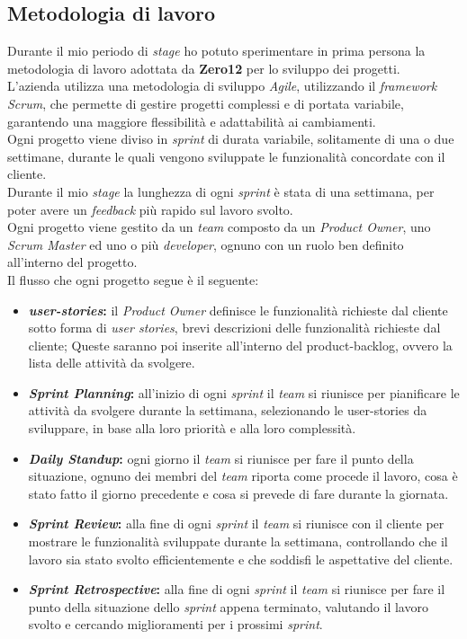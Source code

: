 \subsection{Metodologia di lavoro}
\label{sez:metodologia-lavoro}

Durante il mio periodo di \textit{stage} ho potuto sperimentare in prima persona la metodologia di lavoro adottata da \textbf{Zero12} per lo sviluppo dei progetti.\\
L'azienda utilizza una metodologia di sviluppo \textit{Agile}, utilizzando il \textit{framework} \textit{Scrum}, che permette di gestire progetti complessi e di portata variabile,
garantendo una maggiore flessibilità e adattabilità ai cambiamenti.\\
Ogni progetto viene diviso in \textit{sprint} di durata variabile, solitamente di una o due settimane, durante le quali vengono sviluppate le funzionalità concordate con il cliente.\\
Durante il mio \textit{stage} la lunghezza di ogni \textit{sprint} è stata di una settimana, per poter avere un \textit{feedback} più rapido sul lavoro svolto.\\
Ogni progetto viene gestito da un \textit{team} composto da un \textit{Product Owner}, uno \textit{Scrum Master} ed uno o più \textit{developer}, ognuno con un ruolo ben definito all'interno del progetto.\\

Il flusso che ogni progetto segue è il seguente:
\begin{itemize}
    \item \textbf{\textit{\gls{user-stories}}:} il \textit{Product Owner} definisce le funzionalità richieste dal cliente sotto forma di \textit{user stories}, brevi descrizioni delle funzionalità richieste dal cliente;
    Queste saranno poi inserite all'interno del \gls{product-backlog}, ovvero la lista delle attività da svolgere.
    \item \textbf{\textit{Sprint Planning}:} all'inizio di ogni \textit{sprint} il \textit{team} si riunisce per pianificare le attività da svolgere durante la settimana, selezionando le \gls{user-stories} da sviluppare, 
    in base alla loro priorità e alla loro complessità.
    \item \textbf{\textit{Daily Standup}:} ogni giorno il \textit{team} si riunisce per fare il punto della situazione, ognuno dei membri del \textit{team} riporta come procede il lavoro,
    cosa è stato fatto il giorno precedente e cosa si prevede di fare durante la giornata.
    \item \textbf{\textit{Sprint Review}:} alla fine di ogni \textit{sprint} il \textit{team} si riunisce con il cliente per mostrare le funzionalità sviluppate durante la settimana, controllando che il lavoro sia stato svolto efficientemente e 
    che soddisfi le aspettative del cliente.
    \item \textbf{\textit{Sprint Retrospective}:} alla fine di ogni \textit{sprint} il \textit{team} si riunisce per fare il punto della situazione dello \textit{sprint} appena terminato, 
    valutando il lavoro svolto e cercando miglioramenti per i prossimi \textit{sprint}.
\end{itemize}